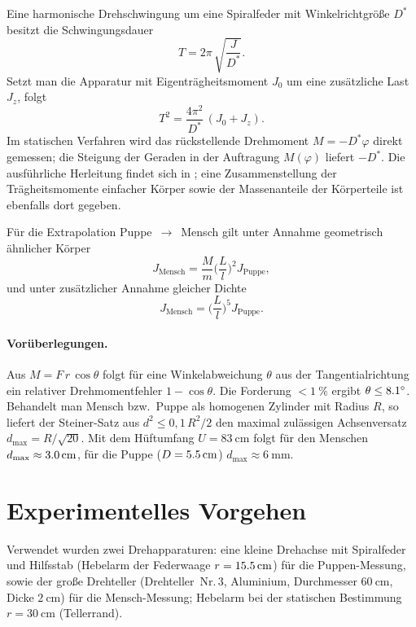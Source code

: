 \documentclass[11pt,a4paper]{article}
\begin{document}
Eine harmonische Drehschwingung um eine Spiralfeder mit
Winkelrichtgröße $D^{*}$ besitzt die Schwingungsdauer
\begin{equation}
  T = 2\pi\,\sqrt{\frac{J}{D^{*}}}. \tag{3}
\end{equation}
Setzt man die Apparatur mit Eigenträgheitsmoment $J_{0}$ um eine
zusätzliche Last $J_{z}$, folgt
\begin{equation}
  T^{2} = \frac{4\pi^{2}}{D^{*}}\,(J_{0} + J_{z}). \tag{4}
\end{equation}
Im statischen Verfahren wird das rückstellende Drehmoment
$M = -D^{*}\varphi$ direkt gemessen; die Steigung der Geraden in
der Auftragung $M(\varphi)$ liefert $-D^{*}$. Die ausführliche
Herleitung findet sich in \cite{anleitung}; eine Zusammenstellung
der Trägheitsmomente einfacher Körper sowie der Massenanteile der
Körperteile ist ebenfalls dort gegeben.

Für die Extrapolation Puppe~$\to$~Mensch gilt unter Annahme
geometrisch ähnlicher Körper
\begin{equation}
  J_{\mathrm{Mensch}} = \frac{M}{m}\Big(\frac{L}{l}\Big)^{2} J_{\mathrm{Puppe}}, \tag{5}
\end{equation}
und unter zusätzlicher Annahme gleicher Dichte
\begin{equation}
  J_{\mathrm{Mensch}} = \Big(\frac{L}{l}\Big)^{5} J_{\mathrm{Puppe}}. \tag{6}
\end{equation}

\paragraph{Vorüberlegungen.}
Aus $M = F\,r\,\cos\theta$ folgt für eine Winkelabweichung
$\theta$ aus der Tangentialrichtung ein relativer Drehmomentfehler
$1-\cos\theta$. Die Forderung $<\SI{1}{\percent}$ ergibt
$\theta \le \SI{8{,}1}{\degree}$. Behandelt man Mensch bzw.\ Puppe als
homogenen Zylinder mit Radius $R$, so liefert der Steiner-Satz aus
$d^{2} \le 0{,}1\,R^{2}/2$ den maximal zulässigen Achsenversatz
$d_{\max} = R/\sqrt{20}$. Mit dem Hüftumfang
$U = \SI{83}{\centi\metre}$ folgt für den Menschen
$d_{\max} \approx \SI{3{,}0}{\centi\metre}$, für die Puppe
($D=\SI{5{,}5}{\centi\metre}$) $d_{\max}\approx\SI{6}{\milli\metre}$.

\section{Experimentelles Vorgehen}
Verwendet wurden zwei Drehapparaturen: eine kleine Drehachse mit
Spiralfeder und Hilfsstab (Hebelarm der Federwaage
$r=\SI{15{,}5}{\centi\metre}$) für die Puppen-Messung, sowie der
große Drehteller (Drehteller~Nr.\,3, Aluminium, Durchmesser
$\SI{60}{\centi\metre}$, Dicke $\SI{2}{\centi\metre}$) für die
Mensch-Messung; Hebelarm bei der statischen Bestimmung
$r=\SI{30}{\centi\metre}$ (Tellerrand).
\end{document}
